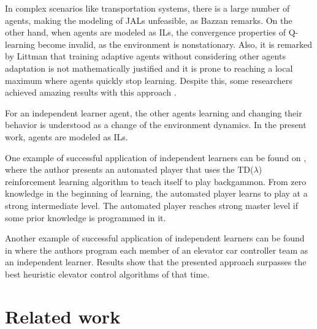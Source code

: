 \documentclass{RITA}
\begin{document}
In complex scenarios like transportation systems, there is a large number of agents, making the modeling of JALs unfeasible, as Bazzan \cite{Bazzan2009} remarks. On the other hand, when agents are modeled as ILs, the convergence properties of Q-learning become invalid, as the environment is nonstationary. Also, it is remarked by Littman \cite{Littman1994} that training adaptive agents without considering other agents adaptation is not mathematically justified and it is prone to reaching a local maximum where agents quickly stop learning. Despite this, some researchers achieved amazing results with this approach \cite{Littman1994}.

For an independent learner agent, the other agents learning and changing their behavior is understood as a change of the environment dynamics. In the present work, agents are modeled as ILs. %

One example of successful application of independent learners can be found on \cite{Tesauro1994}, where the author presents an automated player that uses the TD($\lambda$) reinforcement learning algorithm \cite{Sutton1988} to teach itself to play backgammon. From zero knowledge in the beginning of learning, the automated player learns to play at a strong intermediate level. The automated player reaches strong master level if some prior knowledge is programmed in it. 

Another example of successful application of independent learners can be found in \cite{Crites&Barto1998} where the authors program each member of an elevator car controller team as an independent learner. Results show that the presented approach surpasses the best heuristic elevator control algorithms of that time.




\section{Related work}
\label{sec:related}
\end{document}
